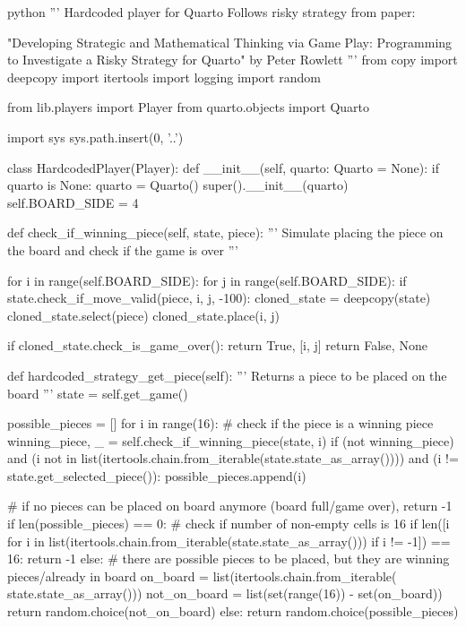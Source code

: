 \begin{mintedbox}{python}
'''
Hardcoded player for Quarto
Follows risky strategy from paper:

"Developing Strategic and Mathematical Thinking via Game Play:
Programming to Investigate a Risky Strategy for Quarto"
by Peter Rowlett
'''
from copy import deepcopy
import itertools
import logging
import random

from lib.players import Player
from quarto.objects import Quarto

import sys
sys.path.insert(0, '..')

class HardcodedPlayer(Player):
    def __init__(self, quarto: Quarto = None):
        if quarto is None:
            quarto = Quarto()
        super().__init__(quarto)
        self.BOARD_SIDE = 4

    def check_if_winning_piece(self, state, piece):
        '''
        Simulate placing the piece on the board and check if the game is over
        '''

        for i in range(self.BOARD_SIDE):
            for j in range(self.BOARD_SIDE):
                if state.check_if_move_valid(piece, i, j, -100):
                    cloned_state = deepcopy(state)
                    cloned_state.select(piece)
                    cloned_state.place(i, j)

                    if cloned_state.check_is_game_over():
                        return True, [i, j]
        return False, None

    def hardcoded_strategy_get_piece(self):
        '''
        Returns a piece to be placed on the board
        '''
        state = self.get_game()

        possible_pieces = []
        for i in range(16):
            # check if the piece is a winning piece
            winning_piece, _ = self.check_if_winning_piece(state, i)
            if (not winning_piece) and (i not in list(itertools.chain.from_iterable(state.state_as_array()))) and (i != state.get_selected_piece()):
                possible_pieces.append(i)

        # if no pieces can be placed on board anymore (board full/game over), return -1
        if len(possible_pieces) == 0:
            # check if number of non-empty cells is 16
            if len([i for i in list(itertools.chain.from_iterable(state.state_as_array())) if i != -1]) == 16:
                return -1
            else:
                # there are possible pieces to be placed, but they are winning pieces/already in board
                on_board = list(itertools.chain.from_iterable(
                    state.state_as_array()))
                not_on_board = list(set(range(16)) - set(on_board))
                return random.choice(not_on_board)
        else:
            return random.choice(possible_pieces)


\end{mintedbox}
